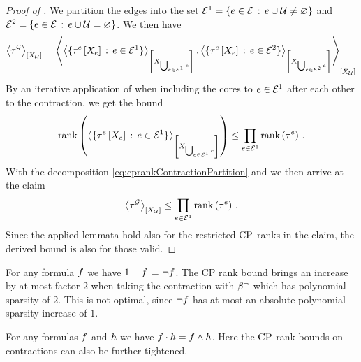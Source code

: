 \begin{proof}[Proof of ]
    We partition the edges into the set $\mathcal{E}^{1}= \{e\in\mathcal{E} \,:\, e\cup\mathcal{U}\neq\varnothing\}$ and $\mathcal{E}^{2}= \{e\in\mathcal{E} \,:\, e\cup\mathcal{U}=\varnothing\}$.
    We then have
    \begin{align}
        \label{eq:cprankContractionPartition}
        \left\langle \tau^{\mathcal{G}}\right\rangle_{\left[ X_{\mathcal{U}} \right]}
        = \left\langle 
            \left\langle \{\tau^{e}\left[X_{e}\right] \,:\, e\in\mathcal{E}^{1}\}\right\rangle_{\left[ X_{\bigcup_{e\in\mathcal{E}^{1}}e} \right]},
            \left\langle \{\tau^{e}\left[X_{e}\right] \,:\, e\in\mathcal{E}^{2}\}\right\rangle_{\left[ X_{\bigcup_{e\in\mathcal{E}^{2}}e} \right]}
        \right\rangle_{\left[ X_{\mathcal{U}} \right]}
    \end{align}
    By an iterative application of  when including the cores to $e\in\mathcal{E}^{1}$ after each other to the contraction, we get the bound
    \begin{align*}
        \mathrm{rank}\left(\left\langle \{\tau^{e}\left[X_{e}\right] \,:\, e\in\mathcal{E}^{1}\}\right\rangle_{\left[ X_{\bigcup_{e\in\mathcal{E}^{1}}e} \right]}\right)
        \leq \prod_{e\in\mathcal{E}^{1}} \mathrm{rank}\left(\tau^{e}\right) \, .
    \end{align*}
    With the decomposition \eqref{eq:cprankContractionPartition} and  we then arrive at the claim
    \begin{align*}
        \left\langle \tau^{\mathcal{G}}\right\rangle_{\left[ X_{\mathcal{U}} \right]} \leq \prod_{e\in\mathcal{E}^{1}} \mathrm{rank}\left(\tau^{e}\right) \, .
    \end{align*}
    Since the applied lemmata hold also for the restricted $\mathrm{CP}$ ranks in the claim, the derived bound is also for those valid.
\end{proof}


\begin{example}
    For any formula $f$ we have $1-f$ = $\lnot f$.
    The CP rank bound brings an increase by at most factor $2$ when taking the contraction with $\beta^{\lnot}$ which has polynomial sparsity of $2$.
    This is not optimal, since $\lnot f$ has at most an absolute polynomial sparsity increase of $1$.

    For any formulas $f$ and $h$ we have $f\cdot h = f\land h$.
    Here the $\mathrm{CP}$ rank bounds on contractions can also be further tightened.
\end{example}


